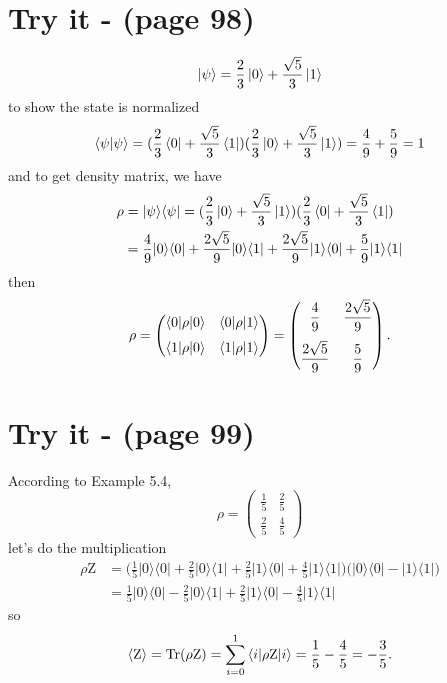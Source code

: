 \documentclass{article}
\newcommand{\op}[2]{|#1\rangle \langle#2|}
\newcommand{\sand}[3]{\braket{#1 | #2 | #3}}
\begin{document}
\section*{Try it - (page 98)}
\begin{equation*}
   \ket{\psi} = \frac{2}{3}\ket{0} + \frac{\sqrt{5}}{3}\ket{1}
\end{equation*}
to show the state is normalized
\begin{equation*}
   \braket{\psi|\psi} = (\frac{2}{3}\bra{0} + \frac{\sqrt{5}}{3}\bra{1})(\frac{2}{3}\ket{0} + \frac{\sqrt{5}}{3}\ket{1}) = \frac{4}{9} + \frac{5}{9} = 1
\end{equation*}
and to get density matrix, we have
\begin{align*}
   \rho &= \op{\psi}{\psi} = (\frac{2}{3}\ket{0} + \frac{\sqrt{5}}{3}\ket{1})(\frac{2}{3}\bra{0} + \frac{\sqrt{5}}{3}\bra{1}) \\
   &= \frac{4}{9}\op{0}{0} + \frac{2\sqrt{5}}{9}\op{0}{1} + \frac{2\sqrt{5}}{9}\op{1}{0} + \frac{5}{9}\op{1}{1}
\end{align*}
then 
\[
\rho = 
\begin{pmatrix}
   \sand{0}{\rho}{0} & \sand{0}{\rho}{1} \\[0.6em]
   \sand{1}{\rho}{0} & \sand{1}{\rho}{1} 
\end{pmatrix}
=
\begin{pmatrix}
   \displaystyle\frac{4}{9} & \displaystyle\frac{2\sqrt{5}}{9} \\[1em]
   \displaystyle\frac{2\sqrt{5}}{9} & \displaystyle\frac{5}{9}
\end{pmatrix}.
\]
\section*{Try it - (page 99)}
According to Example 5.4,
\begin{equation*}
   \rho =  
   \begin{pmatrix}
      \displaystyle\frac{1}{5} & \displaystyle\frac{2}{5} \\[1em]
      \displaystyle\frac{2}{5} & \displaystyle\frac{4}{5}
   \end{pmatrix}
\end{equation*}
let's do the multiplication
\begin{align*}
   \rho \text{Z} &= \big(\frac{1}{5}\op{0}{0} + \frac{2}{5}\op{0}{1} + \frac{2}{5}\op{1}{0} + \frac{4}{5}\op{1}{1}\big)\big(\op{0}{0}-\op{1}{1}\big) \\
   &= \frac{1}{5}\op{0}{0} - \frac{2}{5}\op{0}{1} + \frac{2}{5}\op{1}{0} - \frac{4}{5}\op{1}{1}
\end{align*}
so
\begin{equation*}
   \braket{\text{Z}} = \text{Tr}(\rho \text{Z}) = \sum_{i=0}^{1} \sand{i}{\rho \text{Z}}{i}  = \frac{1}{5} - \frac{4}{5} = -\frac{3}{5}.
\end{equation*}
\end{document}
